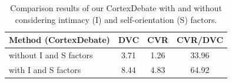 \begin{table}
  \centering
  \setlength{\tabcolsep}{1mm}
\begin{tabular}{l|c|c|c}
\toprule
\multicolumn{1}{c|}{Method (CortexDebate)}    & DVC    & CVR  & CVR/DVC  \\ \midrule
without I and S factors     & 3.71   & 1.26   & 33.96     \\
with I and S factors      & 8.44  & 4.83  & 64.92         \\  \bottomrule
\end{tabular}
  \caption{\label{cooperation}
   Comparison results of our CortexDebate with and without considering intimacy (I) and self-orientation (S) factors.
  }
\end{table}